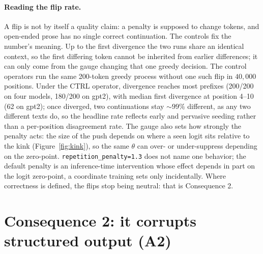 \documentclass[11pt]{article}
\newcommand{\thp}{\theta}
\newcommand{\code}[1]{\texttt{#1}}
\begin{document}
\paragraph{Reading the flip rate.} A flip is not by itself a quality claim: a penalty is supposed
to change tokens, and open-ended prose has no single correct continuation. The controls fix the
number's meaning. Up to
the first divergence the two runs share an identical context, so the first differing token cannot
be inherited from earlier differences; it can only come from the gauge changing that one greedy
decision. The control operators run the same 200-token greedy process without one such flip in
$40{,}000$ positions. Under the CTRL operator, divergence reaches most prefixes (200/200 on four models, 180/200 on gpt2), with median first
divergence at position 4--10 (62 on gpt2); once diverged, two continuations stay
$\sim$$99\%$ different, as any two different texts do, so the headline rate reflects early and
pervasive seeding rather than a per-position disagreement rate. The gauge also sets how strongly
the penalty acts: the size of the push depends on where a seen logit sits relative to the kink
(Figure~\ref{fig:kink}), so the same $\thp$ can over- or under-suppress depending on the
zero-point. \code{repetition\_penalty=1.3} does not name one
behavior; the default penalty is an inference-time intervention whose effect depends in part on
the logit zero-point, a coordinate training sets only incidentally. Where correctness is
defined, the flips stop being neutral: that is Consequence 2.

\section{Consequence 2: it corrupts structured output (A2)}
\end{document}
